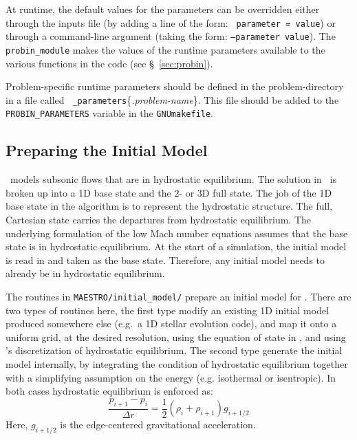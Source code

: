 At runtime, the default values for the parameters can be overridden
either through the inputs file (by adding a line of the form: {\tt
  parameter = value}) or through a command-line argument (taking the
form: {\tt --parameter value}).  The {\tt probin\_module} makes the
values of the runtime parameters available to the various functions
in the code (see \S~\ref{sec:probin}).

Problem-specific runtime parameters should be defined in the
problem-directory in a file called {\tt
  \_parameters}\{{\em.problem-name}\}.  This file should be added
to the {\tt PROBIN\_PARAMETERS} variable in the {\tt GNUmakefile}.



\subsection{Preparing the Initial Model}

\label{sec:initial_models}

\maestro\ models subsonic flows that are in hydrostatic equilibrium.
The solution in \maestro\ is broken up into a 1D base state and the 2-
or 3D full state.  The job of the 1D base state in the algorithm is
to represent the hydrostatic structure.  The full, Cartesian state
carries the departures from hydrostatic equilibrium.  The underlying
formulation of the low Mach number equations assumes that the base
state is in hydrostatic equilibrium.  At the start of a simulation,
the initial model is read in and taken as the base state.  Therefore,
any initial model needs to already be in hydrostatic equilibrium.

The routines in {\tt MAESTRO/initial\_model/} prepare an initial model
for \maestro.  There are two types of routines here, the first type
modify an existing 1D initial model produced somewhere else (e.g.\ a
1D stellar evolution code), and map it onto a uniform grid, at
the desired resolution, using the equation of state in \maestro, and
using \maestro's discretization of hydrostatic equilibrium.  The second
type generate the initial model internally, by integrating the
condition of hydrostatic equilibrium together with a simplifying
assumption on the energy (e.g. isothermal or isentropic).  In
both cases hydrostatic equilibrium is enforced as:
\begin{equation}
\frac{p_{i+1} - p_i}{\Delta r} = \frac{1}{2} (\rho_i + \rho_{i+1})
g_{i+1/2}
\end{equation}
Here, $g_{i+1/2}$ is the edge-centered gravitational acceleration.

